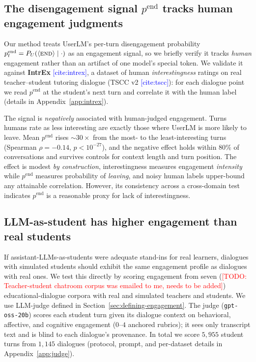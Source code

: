 \documentclass[11pt]{article}
\newcommand{\cit}[1]{\textcolor{blue}{[\textsf{cite:#1}]}}
\newcommand{\todo}[1]{\textcolor{red}{[TODO: #1]}}
\begin{document}
\subsection{The disengagement signal $p^{\text{end}}$ tracks human engagement judgments}
\label{sec:motivation-intrex}

Our method treats UserLM's per-turn disengagement probability
$p^{\text{end}}_t = P_U(\langle\textsc{end}\rangle \mid \cdot)$ as an engagement
signal, so we briefly verify it tracks \emph{human} engagement rather than an
artifact of one model's special token. We validate it against \textbf{IntrEx}
\cit{intrex}, a dataset of human \emph{interestingness} ratings on real
teacher--student tutoring dialogue (TSCC v2 \cit{tscc}): for each dialogue point
we read $p^{\text{end}}$ at the student's next turn and correlate it with the
human label (details in Appendix~\ref{app:intrex}). 

The signal is \emph{negatively} associated with human-judged engagement. 
Turns humans rate as less interesting are exactly those where UserLM is more likely to leave. 
Mean $p^{\text{end}}$ rises ${\sim}30\times$ from the most- to the least-interesting
turns (Spearman $\rho=-0.14$, $p<10^{-27}$), and the negative effect holds within
$80\%$ of conversations and survives controls for context length and turn
position. The effect is modest \emph{by construction}, interestingness measures
engagement \emph{intensity} while $p^{\text{end}}$ measures probability of
\emph{leaving}, and noisy human labels upper-bound any attainable correlation.
However, its consistency across a cross-domain
test indicates $p^{\text{end}}$ is a reasonable proxy for lack of interestingness.

\subsection{LLM-as-student has higher engagement than real students}
\label{sec:motivation-judge}

If assistant-LLMs-as-students were adequate stand-ins for real learners, dialogues with simulated students should exhibit the same engagement profile as dialogues with real ones. 
We test this directly by scoring engagement from seven (\todo{Teacher-student chatroom corpus was emailed to me, needs to be added}) educational-dialogue corpora with real and simulated teachers and students. We use LLM-judge defined in Section~\ref{sec:defining-engagement}. 
The judge (\texttt{gpt-oss-20b}) scores each student turn given its dialogue context on behavioral, affective, and cognitive engagement ($0$--$4$ anchored rubrics); it sees
only transcript text and is blind to each dialogue's provenance. 
In total we score $5{,}955$ student turns from $1{,}145$ dialogues (protocol, prompt, and per-dataset details in Appendix~\ref{app:judge}).
\end{document}
